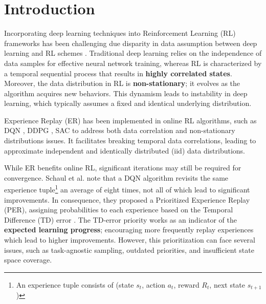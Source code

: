 
\chapter{Introduction}

Incorporating deep learning techniques into Reinforcement Learning (RL) frameworks has been challenging due disparity in data assumption between deep learning and RL schemes \cite{mnih2013playing}. Traditional deep learning relies on the independence of data samples for effective neural network training, whereas RL is characterized by a temporal sequential process that results in \textbf{highly correlated states}. Moreover, the data distribution in RL is \textbf{non-stationary}; it evolves as the algorithm acquires new behaviors. This dynamism leads to instability in deep learning, which typically assumes a fixed and identical underlying distribution.

Experience Replay (ER) has been implemented in online RL algorithms, such as DQN \cite{mnih2013playing}, DDPG \cite{lillicrap2015continuous}, SAC \cite{haarnoja2018soft} to address both data correlation and non-stationary distributions issues. It facilitates breaking temporal data correlations, leading to approximate independent and identically distributed (iid) data distributions.

While ER benefits online RL, significant iterations may still be required for convergence. Schaul et al. \cite{schaul2015prioritized} note that a DQN algorithm revisits the same experience tuple\footnote[2]{An experience tuple consists of (state $s_{t}$, action $a_{t}$, reward $R_{t}$, next state $s_{t+1}$)} an average of eight times, not all of which lead to significant improvements. In consequence, they proposed a Prioritized Experience Replay (PER), assigning probabilities to each experience based on the Temporal Difference (TD) error \cite{sutton2018reinforcement}. The TD-error priority works as an indicator of the \textbf{expected learning progress}; encouraging more frequently replay experiences which lead to higher improvements. However, this prioritization can face several issues, such as task-agnostic sampling, outdated priorities, and insufficient state space coverage.

